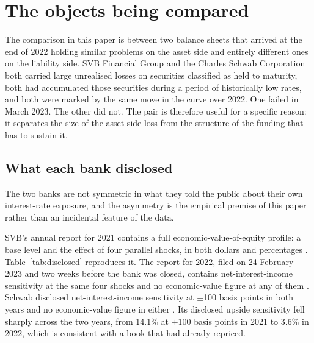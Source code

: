 \section{The objects being compared}
\label{sec:objects}

The comparison in this paper is between two balance sheets that arrived at the end
of 2022 holding similar problems on the asset side and entirely different ones on
the liability side. SVB Financial Group and the Charles Schwab Corporation both
carried large unrealised losses on securities classified as held to maturity, both
had accumulated those securities during a period of historically low rates, and
both were marked by the same move in the curve over 2022. One failed in March 2023.
The other did not. The pair is therefore useful for a specific reason: it separates
the size of the asset-side loss from the structure of the funding that has to
sustain it.

\subsection{What each bank disclosed}

The two banks are not symmetric in what they told the public about their own
interest-rate exposure, and the asymmetry is the empirical premise of this paper
rather than an incidental feature of the data.

SVB's annual report for 2021 contains a full economic-value-of-equity profile:
a base level and the effect of four parallel shocks, in both dollars and
percentages \citep{SVB10K2021}. Table~\ref{tab:disclosed} reproduces it. The
report for 2022, filed on 24 February 2023 and two weeks before the bank was
closed, contains net-interest-income sensitivity at the same four shocks and no
economic-value figure at any of them \citep{SVB10K2022}. Schwab disclosed
net-interest-income sensitivity at $\pm$100 basis points in both years and no
economic-value figure in either \citep{Schwab10K2021, Schwab10K2022}. Its
disclosed upside sensitivity fell sharply across the two years, from 14.1\% at
$+100$ basis points in 2021 to 3.6\% in 2022, which is consistent with a book
that had already repriced.

